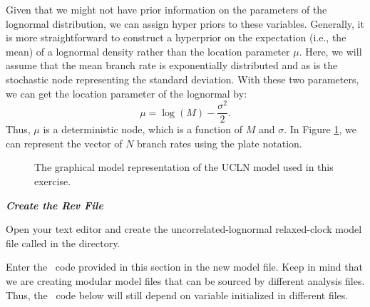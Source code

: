 Given that we might not have prior information on the parameters of the lognormal distribution, we can assign hyper priors to these variables. 
Generally, it is more straightforward to construct a hyperprior on the expectation (i.e., the mean) of a lognormal density rather than the location parameter $\mu$. 
Here, we will assume that the mean branch rate is exponentially distributed and as is the stochastic node representing the standard deviation.
With these two parameters, we can get the location parameter of the lognormal by:
$$\mu = \log(M) - \frac{\sigma^2}{2}.$$
Thus, $\mu$ is a deterministic node, which is a function of $M$ and $\sigma$.
In Figure \ref{m_UCLN:fig}, we can represent the vector of $N$ branch rates using the plate notation. %
\begin{figure}[h!]
\centering
{}
\caption{\small The graphical model representation of the UCLN model used in this exercise.}
\label{m_UCLN:fig}
\end{figure}


%
%
%

\textbf{\textit{Create the Rev File}}

{\begin{framed}
Open your text editor and create the uncorrelated-lognormal relaxed-clock model file called {\textcolor{red}{}} in the  directory.

Enter the \Rev~code provided in this section in the new model file. Keep in mind that we are creating modular model files that can be sourced by different analysis files. Thus, the \Rev~code below will still depend on variable initialized in different files.
\end{framed}}


